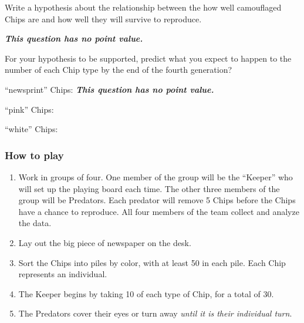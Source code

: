 \documentclass[12pt, addpoints, hidelinks]{exam}
\newcommand*\AnswerBox[2]{%
    \parbox[t][#1]{0.92\textwidth}{%
    \begin{solution}#2\end{solution}}
}
\begin{document}
\begin{questions}

\question
  Write a hypothesis about the relationship between the how well
  camouflaged Chips are and how well they will survive to reproduce.

	\AnswerBox{2\baselineskip}{\textbf{\emph{This question has no point value.}}}
	
\question
  For your hypothesis to be supported, predict what you expect to
  happen to the number of each Chip type by the end of the fourth
  generation?

	``newsprint'' Chips: \ifprintanswers\textbf{\emph{This question has no point value.}}\fi
	
	\vspace*{1\baselineskip}	

	``pink'' Chips: 

	\vspace*{1\baselineskip}	

	``white'' Chips:



\subsubsection*{How to play}

\begin{enumerate}

\item
  Work in groups of four. One member of the group will be the 
  ``Keeper'' who will set up the  playing board each time.  The 
  other three members of the group will be Predators. Each 
  predator will remove 5 Chips before the Chips have a chance 
  to reproduce. All four members of the team collect and analyze the data.

\item
  Lay out the big piece of newspaper on the desk.
  
\item
  Sort the Chips into piles by color, with at least 50 in each pile.
  Each Chip represents an individual.
  
\item
  The Keeper begins by taking 10 of each type of Chip, for a total of
  30.
  
\item\label{start_here}
  The Predators cover their eyes or turn away \emph{until it is their
  individual turn}.
  

\end{enumerate}
\end{questions}
\end{document}
